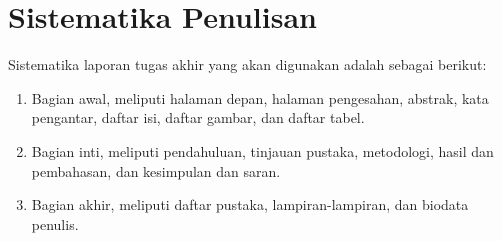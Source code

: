 \section {Sistematika Penulisan}

Sistematika laporan tugas akhir yang akan digunakan adalah sebagai berikut:

\begin{enumerate}
\item Bagian awal, meliputi halaman depan, halaman pengesahan, abstrak, kata pengantar, daftar isi, daftar gambar, dan daftar tabel.
\item Bagian inti, meliputi pendahuluan, tinjauan pustaka, metodologi, hasil dan pembahasan, dan kesimpulan dan saran.
\item Bagian akhir, meliputi daftar pustaka, lampiran-lampiran, dan biodata penulis.
\end{enumerate}